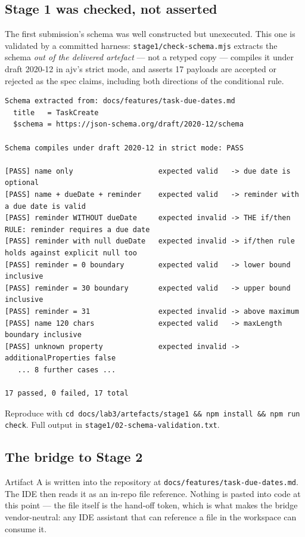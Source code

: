 \documentclass[11pt,a4paper]{article}
\newcommand{\code}[1]{\texttt{\small #1}}
\begin{document}
\subsection{Stage 1 was checked, not asserted}
\label{sec:schemacheck}

The first submission's schema was well constructed but unexecuted. This one is
validated by a committed harness: \code{stage1/check-schema.mjs} extracts the
schema \emph{out of the delivered artefact} --- not a retyped copy --- compiles
it under draft 2020-12 in ajv's strict mode, and asserts 17 payloads are
accepted or rejected as the spec claims, including both directions of the
conditional rule.

\begin{lstlisting}[style=plain]
Schema extracted from: docs/features/task-due-dates.md
  title   = TaskCreate
  $schema = https://json-schema.org/draft/2020-12/schema

Schema compiles under draft 2020-12 in strict mode: PASS

[PASS] name only                    expected valid   -> due date is optional
[PASS] name + dueDate + reminder    expected valid   -> reminder with a due date is valid
[PASS] reminder WITHOUT dueDate     expected invalid -> THE if/then RULE: reminder requires a due date
[PASS] reminder with null dueDate   expected invalid -> if/then rule holds against explicit null too
[PASS] reminder = 0 boundary        expected valid   -> lower bound inclusive
[PASS] reminder = 30 boundary       expected valid   -> upper bound inclusive
[PASS] reminder = 31                expected invalid -> above maximum
[PASS] name 120 chars               expected valid   -> maxLength boundary inclusive
[PASS] unknown property             expected invalid -> additionalProperties false
   ... 8 further cases ...

17 passed, 0 failed, 17 total
\end{lstlisting}

\noindent Reproduce with \code{cd docs/lab3/artefacts/stage1 \&\& npm install
\&\& npm run check}. Full output in \code{stage1/02-schema-validation.txt}.

\subsection{The bridge to Stage 2}

Artifact A is written into the repository at
\code{docs/features/task-due-dates.md}. The IDE then reads it as an in-repo
file reference. Nothing is pasted into code at this point --- the file itself is
the hand-off token, which is what makes the bridge vendor-neutral: any IDE
assistant that can reference a file in the workspace can consume it.
\end{document}
